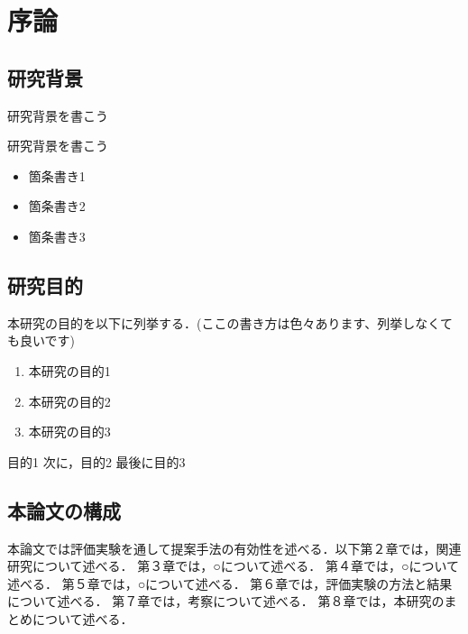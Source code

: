 \chapter{序論}
\section{研究背景}
研究背景を書こう

研究背景を書こう

\begin{itemize}
\item 箇条書き1
\item 箇条書き2
\item 箇条書き3
\end{itemize}

\section{研究目的}
\label{sec:1.2}
本研究の目的を以下に列挙する．(ここの書き方は色々あります、列挙しなくても良いです)

\begin{enumerate}
\renewcommand{\labelenumi}{(\alph{enumi})}
\item 本研究の目的1
\item 本研究の目的2
\item 本研究の目的3
\end{enumerate}

目的1
次に，目的2
最後に目的3

\section{本論文の構成}
本論文では評価実験を通して提案手法の有効性を述べる．以下第２章では，関連研究について述べる．
第３章では，○について述べる．
第４章では，○について述べる．
第５章では，○について述べる．
第６章では，評価実験の方法と結果について述べる．
第７章では，考察について述べる．
第８章では，本研究のまとめについて述べる．